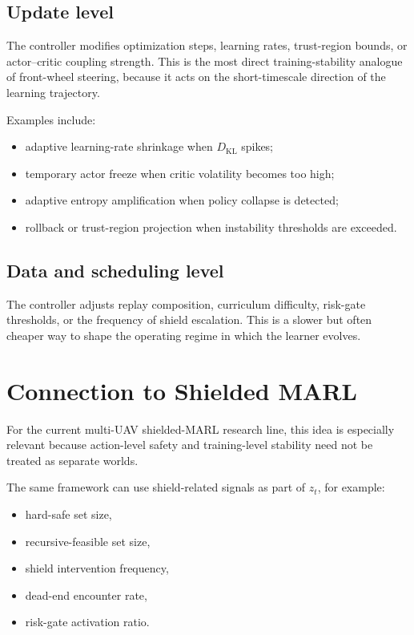 \documentclass[11pt]{article}
\begin{document}
\subsection{Update level}

The controller modifies optimization steps, learning rates, trust-region bounds, or actor--critic coupling strength. This is the most direct training-stability analogue of front-wheel steering, because it acts on the short-timescale direction of the learning trajectory.

Examples include:
\begin{itemize}[leftmargin=1.5em]
    \item adaptive learning-rate shrinkage when $D_{\mathrm{KL}}$ spikes;
    \item temporary actor freeze when critic volatility becomes too high;
    \item adaptive entropy amplification when policy collapse is detected;
    \item rollback or trust-region projection when instability thresholds are exceeded.
\end{itemize}

\subsection{Data and scheduling level}

The controller adjusts replay composition, curriculum difficulty, risk-gate thresholds, or the frequency of shield escalation. This is a slower but often cheaper way to shape the operating regime in which the learner evolves.

\section{Connection to Shielded MARL}

For the current multi-UAV shielded-MARL research line, this idea is especially relevant because action-level safety and training-level stability need not be treated as separate worlds.

The same framework can use shield-related signals as part of $z_t$, for example:
\begin{itemize}[leftmargin=1.5em]
    \item hard-safe set size,
    \item recursive-feasible set size,
    \item shield intervention frequency,
    \item dead-end encounter rate,
    \item risk-gate activation ratio.
\end{itemize}
\end{document}
